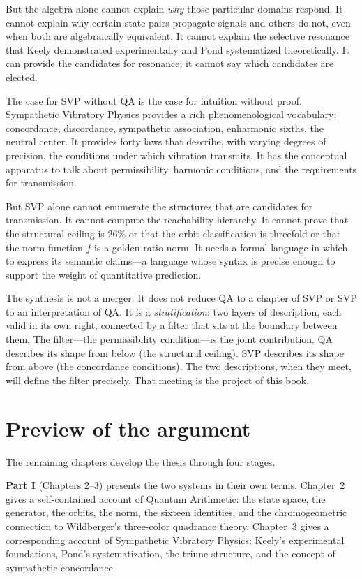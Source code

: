 \documentclass[11pt,a4paper]{article}
\begin{document}
But the algebra alone cannot explain \emph{why} those particular
domains respond. It cannot explain why certain state pairs propagate
signals and others do not, even when both are algebraically equivalent.
It cannot explain the selective resonance that Keely demonstrated
experimentally and Pond systematized theoretically. It can provide the
candidates for resonance; it cannot say which candidates are elected.

The case for SVP without QA is the case for intuition without proof.
Sympathetic Vibratory Physics provides a rich phenomenological
vocabulary: concordance, discordance, sympathetic association,
enharmonic sixths, the neutral center. It provides forty laws that
describe, with varying degrees of precision, the conditions under which
vibration transmits. It has the conceptual apparatus to talk about
permissibility, harmonic conditions, and the requirements for
transmission.

But SVP alone cannot enumerate the structures that are candidates for
transmission. It cannot compute the reachability hierarchy. It cannot
prove that the structural ceiling is $26\%$ or that the orbit
classification is threefold or that the norm function $f$ is a
golden-ratio norm. It needs a formal language in which to express its
semantic claims---a language whose syntax is precise enough to support
the weight of quantitative prediction.

The synthesis is not a merger. It does not reduce QA to a chapter of SVP
or SVP to an interpretation of QA. It is a \emph{stratification}: two
layers of description, each valid in its own right, connected by a filter
that sits at the boundary between them. The filter---the permissibility
condition---is the joint contribution. QA describes its shape from below
(the structural ceiling). SVP describes its shape from above (the
concordance conditions). The two descriptions, when they meet, will
define the filter precisely. That meeting is the project of this book.

\section{Preview of the argument}

The remaining chapters develop the thesis through four stages.

\textbf{Part I} (Chapters 2--3) presents the two systems in their own
terms. Chapter~2 gives a self-contained account of Quantum Arithmetic:
the state space, the generator, the orbits, the norm, the sixteen
identities, and the chromogeometric connection to Wildberger's
three-color quadrance theory. Chapter~3 gives a corresponding account of
Sympathetic Vibratory Physics: Keely's experimental foundations, Pond's
systematization, the triune structure, and the concept of sympathetic
concordance.
\end{document}
